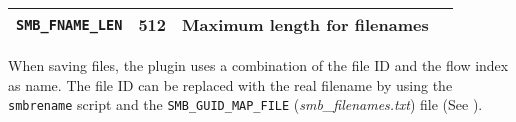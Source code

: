 \documentclass[documentation]{subfiles}
\begin{document}
\begin{longtable}{lcll}
    {\tt SMB\_FNAME\_LEN} & 512 & Maximum length for filenames &\\
    \bottomrule
\end{longtable}

When saving files, the plugin uses a combination of the file ID and the flow index as name. The file ID can be replaced with the real filename by using the {\tt smbrename} script and the {\tt SMB\_GUID\_MAP\_FILE} ({\em smb\_filenames.txt}) file (See ).
\end{document}
